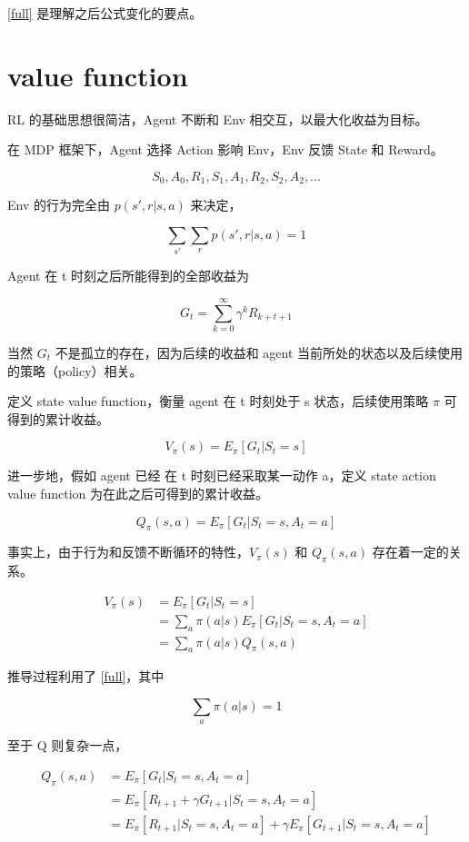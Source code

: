 \documentclass{article}
\begin{document}
\cref{full} 是理解之后公式变化的要点。
 

\section{value function}

RL 的基础思想很简洁，Agent 不断和 Env 相交互，以最大化收益为目标。

在 MDP 框架下，Agent 选择 Action 影响 Env，Env 反馈 State 和 Reward。

$$
S_0, A_0, R_1, S_1, A_1, R_2, S_2, A_2, ...
$$

Env 的行为完全由 $p(s', r|s, a)$ 来决定，

$$
\sum_{s'} \sum_r p(s', r|s, a) = 1
$$


Agent 在 t 时刻之后所能得到的全部收益为

\begin{equation}
 G_t = \sum_{k=0}^{\infty} \gamma^k R_{k+t+1}
\end{equation}

当然 $G_t$ 不是孤立的存在，因为后续的收益和 agent 当前所处的状态以及后续使用的策略（policy）相关。

定义 state value function，衡量 agent 在 t 时刻处于 s 状态，后续使用策略 $\pi$ 可得到的累计收益。

 $$
 V_\pi(s) = E_\pi[G_t | S_t = s]
 $$
 
进一步地，假如 agent 已经 在 t 时刻已经采取某一动作 a，定义 state action value function 为在此之后可得到的累计收益。

 $$
 Q_\pi(s, a) = E_\pi[G_t| S_t = s, A_t = a]
 $$

事实上，由于行为和反馈不断循环的特性，$V_\pi(s)$ 和 $Q_\pi(s, a)$ 存在着一定的关系。
 
\begin{align}
 V_\pi(s) &= E_\pi[G_t | S_t = s] \nonumber \\
          &= \sum_a \pi(a|s) E_\pi[G_t| S_t = s, A_t = a] \nonumber \\
          &= \sum_a \pi(a|s) Q_\pi(s, a) \label{vq}
\end{align}

 
推导过程利用了 \cref{full}，其中
 
 $$
 \sum_a \pi(a|s) = 1
 $$
 
 
至于 Q 则复杂一点，
 
\begin{align}
Q_\pi(s, a) &= E_\pi[G_t| S_t = s, A_t = a] \nonumber \\
            &= E_\pi[R_{t+1} + \gamma G_{t+1}| S_t = s, A_t = a] \nonumber \\
            &= E_\pi[R_{t+1} | S_t = s, A_t = a] + \gamma E_\pi[G_{t+1}| S_t = s, A_t = a] \nonumber
\end{align}
 
\end{document}
